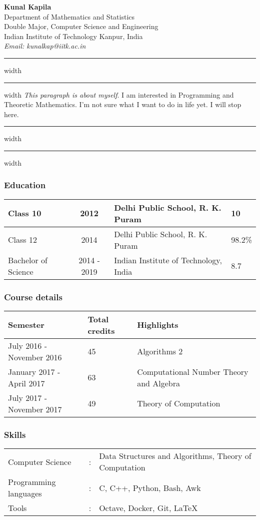 \documentclass[a4paper,10pt]{article}
\begin{document}
\noindent
\textbf{Kunal Kapila}\\
Department of Mathematics and Statistics\\
Double Major, Computer Science and Engineering\\
Indian Institute of Technology Kanpur, India\\
\textit{Email: kunalkap@iitk.ac.in}\\

\hrule width \hsize \kern 1mm \hrule width \hsize \kern 2mm
\noindent
\textit{This paragraph is about myself}. I am interested in Programming and Theoretic Mathematics. I'm not sure what I want to do in life yet. I will stop here.
\vspace{2mm}
\hrule width \hsize \kern 1mm \hrule width \hsize

\subsubsection*{Education}
\begin{tabular}{ | l | c | l | l | }
    \hline
    Class 10 & 2012 & Delhi Public School, R. K. Puram & 10 \\
    \hline
    Class 12 & 2014 & Delhi Public School, R. K. Puram & 98.2\% \\
    \hline
    Bachelor of Science & 2014 - 2019 & Indian Institute of Technology, India & 8.7\\
    \hline
\end{tabular}
\subsubsection*{Course details}
\begin{tabular}{ |l | l | l |  }
    \hline
    \textbf{Semester} & \textbf{Total credits} & \textbf{Highlights}\\
    \hline
    July 2016 - November 2016 & 45 & Algorithms 2 \\
    \hline
    January 2017 - April 2017 & 63 & Computational Number Theory and Algebra\\
    \hline
    July 2017 - November 2017 & 49 & Theory of Computation\\
    \hline
\end{tabular}
\subsubsection*{Skills}
\begin{tabular}{ l  l  l   }
    Computer Science & : & Data Structures and Algorithms, Theory of Computation \\
    Programming languages & : & C, C++, Python, Bash, Awk \\
    Tools & : & Octave, Docker, Git, \LaTeX \\
\end{tabular}
\end{document}
